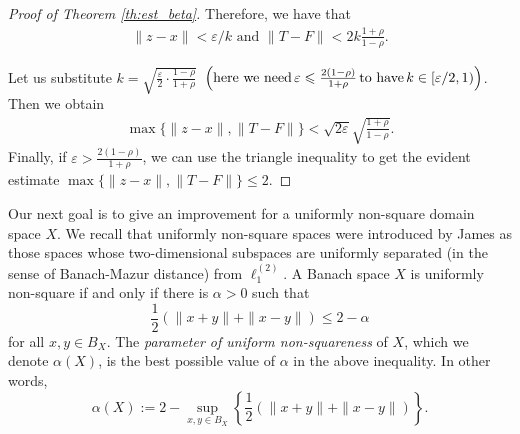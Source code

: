 \documentclass[11pt,a4paper]{amsart}
\newcommand{\eps}{\varepsilon}
\numberwithin{equation}{section}
\theoremstyle{plain}
\theoremstyle{definition}
\renewcommand{\leq}{\leqslant}
\renewcommand{\le}{\leqslant}
\begin{document}
\begin{proof}[Proof of Theorem \ref{th:est_beta}]
Therefore, we have that
\begin{align*}
\|z-x\|< \eps/k 	\mbox{ and } \|T-F\|< 2k \frac{1+\rho}{1-\rho}.
\end{align*}


Let us substitute $k=\sqrt{\frac{\varepsilon}{2}\cdot \frac{1-\rho}{1+\rho}}\,$  $\left( \text{here we need\,} \eps\leq\frac{2(1-\rho)}{1+\rho} \text{\,to have\,} k\in[\eps/2,1) \right)$. Then we obtain 
\begin{align*}
\max\{\|z-x\|, \|T-F\|\}< \sqrt{2\varepsilon}\sqrt{\frac{1+\rho}{1-\rho}}.
\end{align*}
Finally, if $\eps>\frac{2(1-\rho)}{1+\rho}$, we can use the triangle inequality to get the evident estimate $\max\{\|z-x\|, \|T-F\|\} \le 2$.
\end{proof}


Our next goal is to give an improvement for a uniformly non-square domain space $X$. We recall that uniformly non-square spaces were introduced by James \cite{James} as those spaces whose two-dimensional subspaces are uniformly separated (in the sense of Banach-Mazur distance) from $\ell_1^{(2)}$. A Banach space $X$ is uniformly non-square if and only if there is $\alpha>0$ such that
$$
\frac{1}{2}(\|x+y\|+\|x-y\|)\leq 2-\alpha
$$
for all $x, y \in B_X$. The \emph{parameter of uniform non-squareness} of $X$, which we denote $\alpha(X)$, is the best possible value of $\alpha$ in the above inequality. In other words,
$$
\alpha(X) := 2-\underset{x,y\in B_X}{\sup}\left\lbrace\frac{1}{2}(\|x+y\|+\|x-y\|)\right\rbrace.
$$
\end{document}
